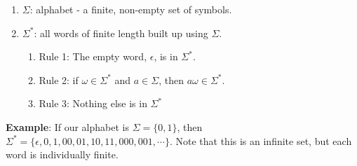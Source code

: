 \documentclass{article}
\begin{document}
\begin{enumerate}
\item $\Sigma$: alphabet - a finite, non-empty set of symbols.

\item $\Sigma^*$: all words of finite length built up using $\Sigma$.
  \begin{enumerate}[label=(\alph*)]
  \item Rule 1: The empty word, $\epsilon$, is in $\Sigma^*$.
  \item Rule 2: if $\omega\in\Sigma^*$ and $a\in\Sigma$, then
    $a\omega\in\Sigma^*$.
  \item Rule 3: Nothing else is in $\Sigma^*$
  \end{enumerate}

\end{enumerate}

\textbf{Example}: If our alphabet is $\Sigma=\{0,1\}$, then
$\Sigma^*=\{\epsilon,0,1,00,01,10,11,000,001,\cdots\}$. Note that this
is an infinite set, but each word is individually finite.
\end{document}
